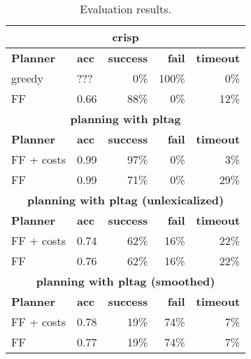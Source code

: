 \begin{table}
    \caption{\label{results} Evaluation results.}
    \begin{center}
    \begin{tabular}{|l|l|r|r|r|}
    \multicolumn{5}{c}{\sc crisp}\\ 
    \hline
     {\bf Planner }  & {\bf acc}& {\bf success} & {\bf fail} & {\bf timeout} \\ \hline 
     greedy         & ??? & 0\% & 100\% & 0\%  \\ \hline 
     FF         &  0.66 & 88\% & 0\% & 12\% \\ \hline 
    \multicolumn{5}{c}{\bf planning with {\sc pltag}}\\\hline
    {\bf Planner }  & {\bf acc}& {\bf success} & {\bf fail} & {\bf timeout} \\ \hline 
     FF + costs &  0.99 &  97\% & 0\% & 3\% \\ \hline
     FF         &  0.99 & 71\% & 0\% &  29\% \\ \hline
    \multicolumn{5}{c}{\bf planning with {\sc pltag} (unlexicalized)}\\\hline
    {\bf Planner }  & {\bf acc}& {\bf success} & {\bf fail} & {\bf timeout} \\ \hline 
     FF + costs & 0.74 & 62\% & 16\% & 22\%\\ \hline
     FF & 0.76 & 62\% & 16\% &  22\%\\ \hline
    \multicolumn{5}{c}{\bf planning with {\sc pltag} (smoothed)}\\\hline
    {\bf Planner }  & {\bf acc}& {\bf success} & {\bf fail} & {\bf timeout} \\ \hline 
     FF + costs & 0.78 & 19\% & 74\% & 7\% \\ \hline
     FF & 0.77 & 19\% & 74\% & 7\% \\ \hline
    \end{tabular}
    \end{center}
\end{table}


